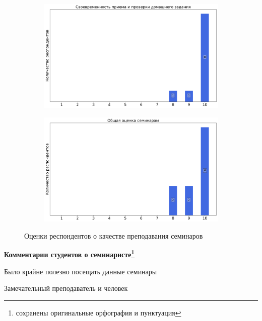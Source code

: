 \begin{figure}[H]
\begin{subfigure}[b]{0.45\textwidth}
				\includegraphics[width=\textwidth]{images/2 course/Кратные интегралы и теория поля/seminarists-marks-Барабанщиков А.В.-2.png}
			\end{subfigure}
			\begin{subfigure}[b]{0.45\textwidth}
				\centering
				\includegraphics[width=\textwidth]{images/2 course/Кратные интегралы и теория поля/seminarists-marks-Барабанщиков А.В.-3.png}
			\end{subfigure}	
			\caption{Оценки респондентов о качестве преподавания семинаров}
		\end{figure}

		\textbf{Комментарии студентов о семинаристе\protect\footnote{сохранены оригинальные орфография и пунктуация}}
            \begin{commentbox} 
                Было крайне полезно посещать данные семинары 
            \end{commentbox} 
        
            \begin{commentbox} 
                Замечательный преподаватель и человек 
            \end{commentbox} 
        
